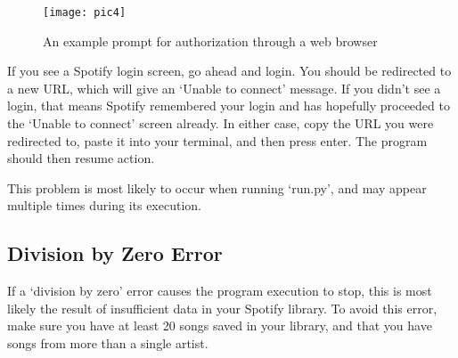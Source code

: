 \documentclass{roffin}
\begin{document}
\begin{figure}[!h]
    \centering
    \texttt{[image: pic4]}
    \caption{An example prompt for authorization through a web browser}
    \label{fig:fig4}
\end{figure}

If you see a Spotify login screen, go ahead and login. You should be redirected to a new URL, which will give an `Unable to connect' message. If you didn't see a login, that means Spotify remembered your login and has hopefully proceeded to the `Unable to connect' screen already. In either case, copy the URL you were redirected to, paste it into your terminal, and then press enter. The program should then resume action. 

This problem is most likely to occur when running `run.py', and may appear multiple times during its execution.

\subsection{Division by Zero Error}
If a `division by zero' error causes the program execution to stop, this is most likely the result of insufficient data in your Spotify library. To avoid this error, make sure you have at least 20 songs saved in your library, and that you have songs from more than a single artist.
\end{document}
